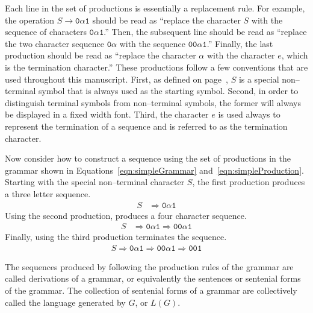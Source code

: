 Each line in the set of productions is essentially a replacement
rule. For example, the operation $S \rightarrow \texttt{0}\alpha
\texttt{1}$ should be read as ``replace the character $S$ with the
sequence of characters $\texttt{0}\alpha \texttt{1}$.''  Then, the
subsequent line should be read as ``replace the two character
sequence $\texttt{0}\alpha$ with the sequence $\texttt{00}\alpha
\texttt{1}$.''  Finally, the last production should be read as
``replace the character $\alpha $ with the character $e$, which is
the termination character.''  These productions follow a few
conventions that are used throughout this manuscript.  First, as
defined on page~\pageref{grammarDefinition}, $S$ is a special
non--terminal symbol that is always used as the starting symbol.
Second, in order to distinguish terminal symbols from non--terminal
symbols, the former will always be displayed in a fixed width font.
Third, the
character $e $ is used always to represent the termination of a
sequence and is referred to as the termination character.

Now consider how to construct a sequence using the set of
productions in the grammar shown in
Equations~\ref{eqn:simpleGrammar} and~\ref{eqn:simpleProduction}.  Starting
with the special non--terminal character $S$, the first production
produces a three letter sequence.
\begin{align*}
    S &\Rightarrow \texttt{0}\alpha \texttt{1}
\end{align*}
Using the second production, produces a four character sequence.
\begin{align*}
    S &\Rightarrow \texttt{0}\alpha \texttt{1}  \Rightarrow \texttt{00}\alpha \texttt{1}
\end{align*}
Finally, using the third production terminates the sequence.
\begin{align}\label{eqn:simpleDerivation}
    S \Rightarrow \texttt{0}\alpha \texttt{1}  \Rightarrow \texttt{00}\alpha \texttt{1}
    \Rightarrow \texttt{001}
\end{align}

The sequences produced by following the production rules of the
grammar are called derivations of a grammar, or equivalently the
sentences or sentenial forms of the grammar.  The collection of
sentenial forms of a grammar are collectively called the language
generated by $G$, or $L(G)$.

